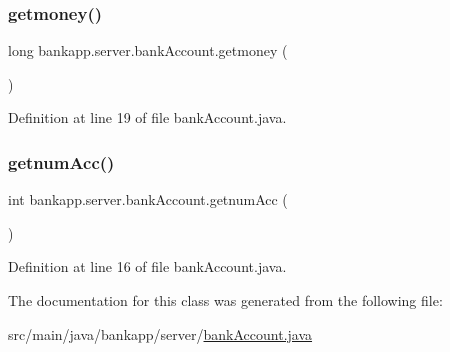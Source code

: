 \subsubsection{\texorpdfstring{getmoney()}{getmoney()}}
{\footnotesize\ttfamily long bankapp.\+server.\+bank\+Account.\+getmoney (\begin{DoxyParamCaption}{ }\end{DoxyParamCaption})}



Definition at line 19 of file bank\+Account.\+java.

\mbox{\label{classbankapp_1_1server_1_1bank_account_a59c7532089ad72e06d43b3360d0f1ef4}} 
\subsubsection{\texorpdfstring{getnum\+Acc()}{getnumAcc()}}
{\footnotesize\ttfamily int bankapp.\+server.\+bank\+Account.\+getnum\+Acc (\begin{DoxyParamCaption}{ }\end{DoxyParamCaption})}



Definition at line 16 of file bank\+Account.\+java.



The documentation for this class was generated from the following file\+:\begin{DoxyCompactItemize}
\item 
src/main/java/bankapp/server/\hyperlink{bank_account_8java}{bank\+Account.\+java}\end{DoxyCompactItemize}
